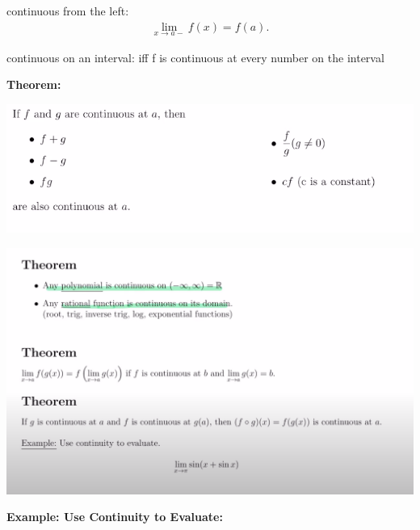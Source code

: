 \documentclass{report}
\begin{document}
        \bigbreak \noindent 
        continuous from the left:
        \begin{align*}
            \lim\limits_{x \to a-}{f \left(x\right) = f \left(a\right)}
        .\end{align*}

        \bigbreak \noindent 
        continuous on an interval: iff f is continuous at every number on the interval 

        \bigbreak \noindent \bigbreak \noindent \bigbreak \noindent 
        \begin{large}
            \textbf{Theorem:}
        \end{large}

        \bigbreak \noindent \bigbreak \noindent 
        \begin{center}
            \includegraphics[scale=0.65]{../images/6.png  }
        \end{center}

        \bigbreak \noindent \bigbreak \noindent 
        \begin{center}
            \includegraphics[scale=0.4]{../images/7.png  }
        \end{center}

        \pagebreak
        \begin{large}
            \noindent \textbf{Example: Use Continuity to Evaluate: }
        \end{large}
\end{document}
